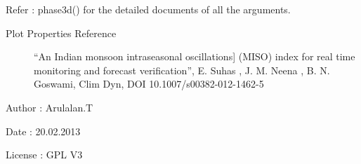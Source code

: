 \documentclass[letterpaper,10pt,english]{sphinxmanual}
\begin{document}
\begin{fulllineitems}
\begin{description}
\end{description}

Refer : phase3d() for the detailed documents of all the arguments.
\begin{description}
\item[{Plot Properties Reference}] \leavevmode{[}``An Indian monsoon intraseasonal oscillations{]}
(MISO) index for real time monitoring and forecast verification'',
E. Suhas , J. M. Neena , B. N. Goswami, Clim Dyn,
DOI 10.1007/s00382-012-1462-5

\end{description}

Author : Arulalan.T

Date : 20.02.2013

License : GPL V3

\end{fulllineitems}

\end{document}

